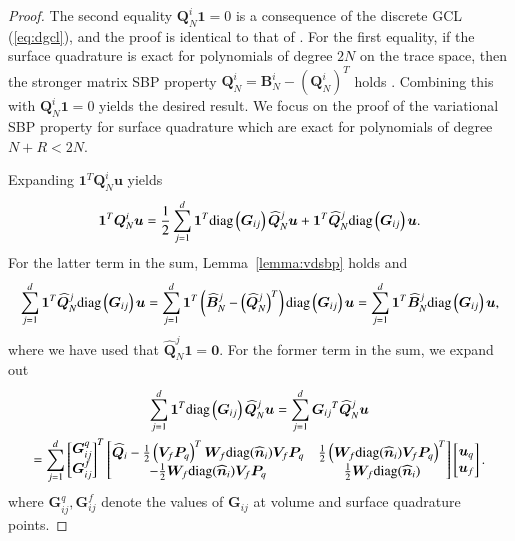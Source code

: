 \documentclass[preprint,10pt]{elsarticle}
\theoremstyle{definition}
\theoremstyle{lemma}
\theoremstyle{corollary}
\theoremstyle{theorem}
\theoremstyle{assumption}
\renewcommand{\hat}[1]{\widehat{#1}}
\newcommand{\LRp}[1]{\left( #1 \right)}
\newcommand{\diag}[1]{{\rm diag}\LRp{#1}}
\begin{document}
\begin{proof}
The second equality $\bm{Q}^i_N \bm{1} = 0$ is a consequence of the discrete GCL (\ref{eq:dgcl}), and the proof is identical to that of \cite{chan2018discretely}.  For the first equality, if the surface quadrature is exact for polynomials of degree $2N$ on the trace space, then the stronger matrix SBP property $\bm{Q}^i_N = \bm{B}^i_N - \LRp{\bm{Q}^i_N}^T$ holds \cite{chan2018discretely}.  Combining this with $\bm{Q}^i_N\bm{1} = 0$ yields the desired result.  We focus on the proof of the variational SBP property for surface quadrature which are exact for polynomials of degree $N+R < 2N$.  

Expanding $\bm{1}^T\bm{Q}^i_N\bm{u}$ yields
\[
\bm{1}^T\bm{Q}^i_N\bm{u} = \frac{1}{2}\sum_{j=1}^d \bm{1}^T \diag{\bm{G}_{ij}} \hat{\bm{Q}}^j_N \bm{u} + \bm{1}^T\hat{\bm{Q}}^j_N \diag{\bm{G}_{ij}} \bm{u}. %
\]
For the latter term in the sum, Lemma~\ref{lemma:vdsbp} holds and
\begin{equation}
\sum_{j=1}^d\bm{1}^T\hat{\bm{Q}}^j_N \diag{\bm{G}_{ij}} \bm{u} = 
\sum_{j=1}^d\bm{1}^T\LRp{\hat{\bm{B}}^j_N - \LRp{\hat{\bm{Q}}^j_N}^T} \diag{\bm{G}_{ij}} \bm{u} = \sum_{j=1}^d\bm{1}^T\hat{\bm{B}}^j_N\diag{\bm{G}_{ij}}\bm{u}, 
\label{eq:vsbp1}
\end{equation}
where we have used that $\hat{\bm{Q}}^j_N \bm{1} = \bm{0}$.  For the former term in the sum, we expand out 
\begin{gather}
\sum_{j=1}^d\bm{1}^T \diag{\bm{G}_{ij}} \hat{\bm{Q}}^j_N \bm{u} = 
\sum_{j=1}^d{\bm{G}_{ij}}^T \hat{\bm{Q}}^j_N \bm{u} \\
= \sum_{j=1}^d\begin{bmatrix}
\bm{G}^q_{ij}\\
\bm{G}^f_{ij}
\end{bmatrix}^T \begin{bmatrix} 
\hat{\bm{Q}}_i - \frac{1}{2}\LRp{\bm{V}_f \bm{P}_q}^T  \bm{W}_f{\rm diag}(\hat{\bm{n}}_i) \bm{V}_f\bm{P}_q &  \frac{1}{2}\LRp{\bm{W}_f{\rm diag}(\hat{\bm{n}}_i)\bm{V}_f\bm{P}_q}^T\label{eq:ibpg}\\
-\frac{1}{2}\bm{W}_f{\rm diag}(\hat{\bm{n}}_i)\bm{V}_f\bm{P}_q & \frac{1}{2}\bm{W}_f{\rm diag}(\hat{\bm{n}}_i)
\end{bmatrix} \begin{bmatrix}\bm{u}_q\\
\bm{u}_f\end{bmatrix}.\nonumber
\end{gather}
where $\bm{G}^q_{ij},\bm{G}^f_{ij}$ denote the values of $\bm{G}_{ij}$ at volume and surface quadrature points.  


\end{proof}
\end{document}
